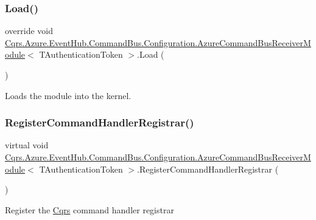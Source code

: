 \subsubsection{\texorpdfstring{Load()}{Load()}}
{\footnotesize\ttfamily override void \hyperlink{classCqrs_1_1Azure_1_1EventHub_1_1CommandBus_1_1Configuration_1_1AzureCommandBusReceiverModule}{Cqrs.\+Azure.\+Event\+Hub.\+Command\+Bus.\+Configuration.\+Azure\+Command\+Bus\+Receiver\+Module}$<$ T\+Authentication\+Token $>$.Load (\begin{DoxyParamCaption}{ }\end{DoxyParamCaption})}



Loads the module into the kernel. 

\mbox{\label{classCqrs_1_1Azure_1_1EventHub_1_1CommandBus_1_1Configuration_1_1AzureCommandBusReceiverModule_a62975fe00dd6c7f62b5eba6bb6eed7c4}} 
\subsubsection{\texorpdfstring{Register\+Command\+Handler\+Registrar()}{RegisterCommandHandlerRegistrar()}}
{\footnotesize\ttfamily virtual void \hyperlink{classCqrs_1_1Azure_1_1EventHub_1_1CommandBus_1_1Configuration_1_1AzureCommandBusReceiverModule}{Cqrs.\+Azure.\+Event\+Hub.\+Command\+Bus.\+Configuration.\+Azure\+Command\+Bus\+Receiver\+Module}$<$ T\+Authentication\+Token $>$.Register\+Command\+Handler\+Registrar (\begin{DoxyParamCaption}{ }\end{DoxyParamCaption})\hspace{0.3cm}{\ttfamily [virtual]}}



Register the \hyperlink{namespaceCqrs}{Cqrs} command handler registrar 



